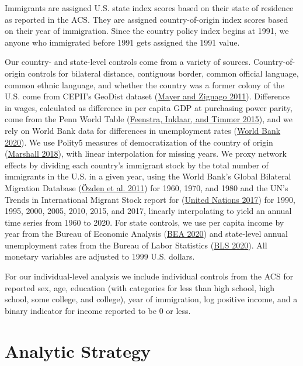 \documentclass[
  11pt,
]{article}
\begin{document}
Immigrants are assigned U.S. state index scores based on their state of residence as reported in the ACS. They are assigned country-of-origin index scores based on their year of immigration. Since the country policy index begins at 1991, we anyone who immigrated before 1991 gets assigned the 1991 value.

Our country- and state-level controls come from a variety of sources. Country-of-origin controls for bilateral distance, contiguous border, common official language, common ethnic language, and whether the country was a former colony of the U.S. come from CEPII's GeoDist dataset (\protect\hyperlink{ref-mayer_2011}{Mayer and Zignago 2011}). Difference in wages, calculated as difference in per capita GDP at purchasing power parity, come from the Penn World Table (\protect\hyperlink{ref-feenstra_2015}{Feenstra, Inklaar, and Timmer 2015}), and we rely on World Bank data for differences in unemployment rates (\protect\hyperlink{ref-worldbank_2020}{World Bank 2020}). We use Polity5 measures of democratization of the country of origin (\protect\hyperlink{ref-marshall_2018}{Marshall 2018}), with linear interpolation for missing years. We proxy network effects by dividing each country's immigrant stock by the total number of immigrants in the U.S. in a given year, using the World Bank's Global Bilateral Migration Database (\protect\hyperlink{ref-ozden_2011}{Özden et al. 2011}) for 1960, 1970, and 1980 and the UN's Trends in International Migrant Stock report for (\protect\hyperlink{ref-unitednations_2017}{United Nations 2017}) for 1990, 1995, 2000, 2005, 2010, 2015, and 2017, linearly interpolating to yield an annual time series from 1960 to 2020. For state controls, we use per capita income by year from the Bureau of Economic Analysis (\protect\hyperlink{ref-bea_2020}{BEA 2020}) and state-level annual unemployment rates from the Bureau of Labor Statistics (\protect\hyperlink{ref-bls_2020}{BLS 2020}). All monetary variables are adjusted to 1999 U.S. dollars.

For our individual-level analysis we include individual controls from the ACS for reported sex, age, education (with categories for less than high school, high school, some college, and college), year of immigration, log positive income, and a binary indicator for income reported to be 0 or less.

\hypertarget{analytic-strategy}{%
\section{Analytic Strategy}\label{analytic-strategy}}
\end{document}
